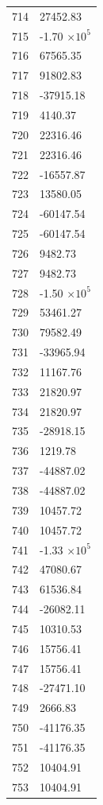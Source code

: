 \documentclass[a4paper,11pt]{article}
\begin{document}
\begin{center}
\begin{longtable}{|R{1.5cm}|R{2.6cm}|}
  714 &     27452.83 \\
  715 &        -1.70 $\times 10^{           5}$ \\
  716 &     67565.35 \\
  717 &     91802.83 \\
  718 &    -37915.18 \\
  719 &      4140.37 \\
  720 &     22316.46 \\
  721 &     22316.46 \\
  722 &    -16557.87 \\
  723 &     13580.05 \\
  724 &    -60147.54 \\
  725 &    -60147.54 \\
  726 &      9482.73 \\
  727 &      9482.73 \\
  728 &        -1.50 $\times 10^{           5}$ \\
  729 &     53461.27 \\
  730 &     79582.49 \\
  731 &    -33965.94 \\
  732 &     11167.76 \\
  733 &     21820.97 \\
  734 &     21820.97 \\
  735 &    -28918.15 \\
  736 &      1219.78 \\
  737 &    -44887.02 \\
  738 &    -44887.02 \\
  739 &     10457.72 \\
  740 &     10457.72 \\
  741 &        -1.33 $\times 10^{           5}$ \\
  742 &     47080.67 \\
  743 &     61536.84 \\
  744 &    -26082.11 \\
  745 &     10310.53 \\
  746 &     15756.41 \\
  747 &     15756.41 \\
  748 &    -27471.10 \\
  749 &      2666.83 \\
  750 &    -41176.35 \\
  751 &    -41176.35 \\
  752 &     10404.91 \\
  753 &     10404.91 \\

\end{longtable}
\end{center}
\end{document}
